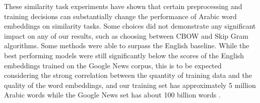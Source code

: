 These similarity task experiments have shown that certain preprocessing and training decisions can substantially change the performance of Arabic word embeddings on similarity tasks. Some choices did not demonstrate any significant impact on any of our results, such as choosing between CBOW and Skip Gram algorithms. Some methods were able to surpass the English baseline. While the best performing models were still significantly below the scores of the English embeddings trained on the Google News corpus, this is to be expected considering the strong correlation between the quantity of training data and the quality of the word embeddings, and our training set has approximately 5 million Arabic words while the Google News set has about 100 billion words \cite{mikolovdist:2013}.







